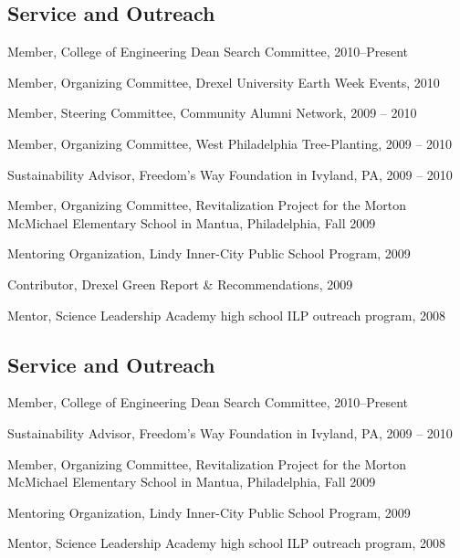 \documentclass[margin]{res}
\begin{document}
\begin{resume}
\begin{educate}
\vspace{-3mm} \section{Service and Outreach}
	\begin{list}{}{\leftmargin=1em} \itemsep -2pt %
	\item Member, College of Engineering Dean Search Committee, 2010--Present
	\item Member, Organizing Committee, Drexel University Earth Week Events, 2010
	\item Member, Steering Committee, Community Alumni Network, 2009 -- 2010
	\item Member, Organizing Committee, West Philadelphia Tree-Planting, 2009 -- 2010
	\item Sustainability Advisor, Freedom's Way Foundation in Ivyland, PA, 2009 -- 2010
	\item Member, Organizing Committee, Revitalization Project for the Morton McMichael Elementary School in Mantua, Philadelphia, Fall 2009
	\item Mentoring Organization, Lindy Inner-City Public School Program, 2009
	\item Contributor, Drexel Green Report \& Recommendations, 2009
	\item Mentor, Science Leadership Academy high school ILP outreach program, 2008 
	\end{list}
\end{educate}
\begin{general}
\vspace{-3mm} \section{Service and Outreach}
	\begin{list}{}{\leftmargin=1em} \itemsep -2pt %
	\item Member, College of Engineering Dean Search Committee, 2010--Present
	\item Sustainability Advisor, Freedom's Way Foundation in Ivyland, PA, 2009 -- 2010
	\item Member, Organizing Committee, Revitalization Project for the Morton McMichael Elementary School in Mantua, Philadelphia, Fall 2009
	\item Mentoring Organization, Lindy Inner-City Public School Program, 2009
	\item Mentor, Science Leadership Academy high school ILP outreach program, 2008 
	\end{list}
\end{general}


\end{resume}
\end{document}
